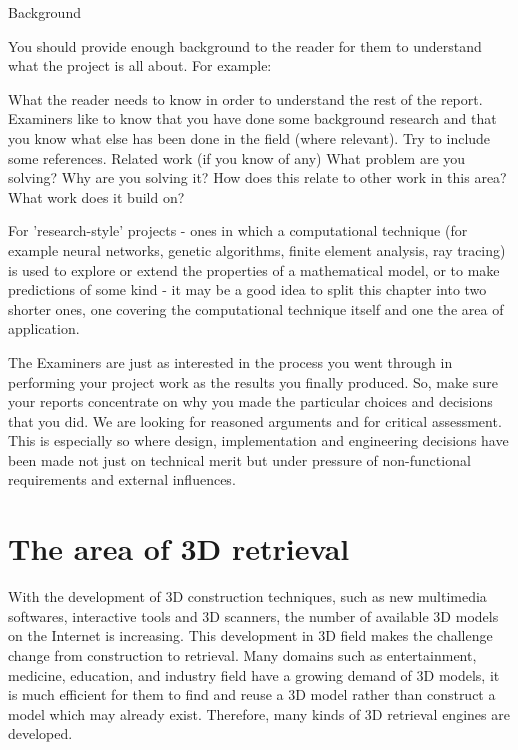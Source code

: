 Background

You should provide enough background to the reader for them to understand what the project is all about. For example:
 

    What the reader needs to know in order to understand the rest of the report. Examiners like to know that you have done some background research and that you know what else has been done in the field (where relevant). Try to include some references.
    Related work (if you know of any)
    What problem are you solving?
    Why are you solving it?
    How does this relate to other work in this area?
    What work does it build on?

 

For 'research-style' projects - ones in which a computational technique (for example neural networks, genetic algorithms, finite element analysis, ray tracing) is used to explore or extend the properties of a mathematical model, or to make predictions of some kind - it may be a good idea to split this chapter into two shorter ones, one covering the computational technique itself and one the area of application.
 

The Examiners are just as interested in the process you went through in performing your project work as the results you finally produced. So, make sure your reports concentrate on why you made the particular choices and decisions that you did. We are looking for reasoned arguments and for critical assessment. This is especially so where design, implementation and engineering decisions have been made not just on technical merit but under pressure of non-functional requirements and external influences.


\section{The area of 3D retrieval}
With the development of 3D construction techniques, such as new multimedia softwares, interactive tools and 3D scanners, the number of available 3D models on the Internet is increasing. This development in 3D field makes the challenge change from construction to retrieval. Many domains such as entertainment, medicine, education, and industry field have a growing demand of 3D models, it is much efficient for them to find and reuse a 3D model rather than construct a model which may already exist. Therefore, many kinds of 3D retrieval engines are developed.

